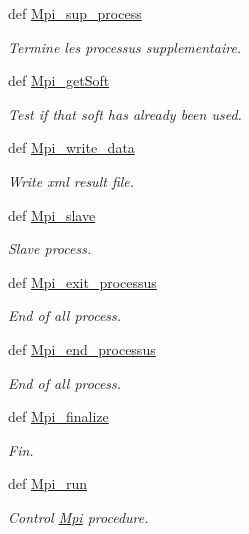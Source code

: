 \begin{DoxyCompactItemize}
def \hyperlink{classirna_1_1iRNA__pred_1_1Mpi_1_1Mpi_a2c250e47d7d9999c2a93943afea5bc3b}{\-Mpi\-\_\-sup\-\_\-process}
\begin{DoxyCompactList}\small\item\em \-Termine les processus supplementaire. \end{DoxyCompactList}\item 
def \hyperlink{classirna_1_1iRNA__pred_1_1Mpi_1_1Mpi_a78c21dcd8549685ff7148825a713023f}{\-Mpi\-\_\-get\-Soft}
\begin{DoxyCompactList}\small\item\em \-Test if that soft has already been used. \end{DoxyCompactList}\item 
def \hyperlink{classirna_1_1iRNA__pred_1_1Mpi_1_1Mpi_a120438b7c216d78dec1b28b64e1d6732}{\-Mpi\-\_\-write\-\_\-data}
\begin{DoxyCompactList}\small\item\em \-Write xml result file. \end{DoxyCompactList}\item 
def \hyperlink{classirna_1_1iRNA__pred_1_1Mpi_1_1Mpi_a2e221fc9ff1fb6484a0458797af0232e}{\-Mpi\-\_\-slave}
\begin{DoxyCompactList}\small\item\em \-Slave process. \end{DoxyCompactList}\item 
def \hyperlink{classirna_1_1iRNA__pred_1_1Mpi_1_1Mpi_a734a21178e3cd28552fca921490711d9}{\-Mpi\-\_\-exit\-\_\-processus}
\begin{DoxyCompactList}\small\item\em \-End of all process. \end{DoxyCompactList}\item 
def \hyperlink{classirna_1_1iRNA__pred_1_1Mpi_1_1Mpi_a56f51c6b022c55042841902340526719}{\-Mpi\-\_\-end\-\_\-processus}
\begin{DoxyCompactList}\small\item\em \-End of all process. \end{DoxyCompactList}\item 
def \hyperlink{classirna_1_1iRNA__pred_1_1Mpi_1_1Mpi_aa1f9ea2ea93b0b300cc5ecffca5247ab}{\-Mpi\-\_\-finalize}
\begin{DoxyCompactList}\small\item\em \-Fin. \end{DoxyCompactList}\item 
def \hyperlink{classirna_1_1iRNA__pred_1_1Mpi_1_1Mpi_ad57efdef10fd4c49c8460d56054e683e}{\-Mpi\-\_\-run}
\begin{DoxyCompactList}\small\item\em \-Control \hyperlink{classirna_1_1iRNA__pred_1_1Mpi_1_1Mpi}{\-Mpi} procedure. \end{DoxyCompactList}\end{DoxyCompactItemize}
